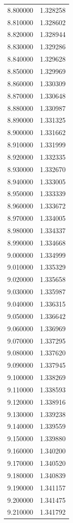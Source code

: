 \begin{tabular}{rr}
8.800000 & 1.328258 \\
8.810000 & 1.328602 \\
8.820000 & 1.328944 \\
8.830000 & 1.329286 \\
8.840000 & 1.329628 \\
8.850000 & 1.329969 \\
8.860000 & 1.330309 \\
8.870000 & 1.330648 \\
8.880000 & 1.330987 \\
8.890000 & 1.331325 \\
8.900000 & 1.331662 \\
8.910000 & 1.331999 \\
8.920000 & 1.332335 \\
8.930000 & 1.332670 \\
8.940000 & 1.333005 \\
8.950000 & 1.333339 \\
8.960000 & 1.333672 \\
8.970000 & 1.334005 \\
8.980000 & 1.334337 \\
8.990000 & 1.334668 \\
9.000000 & 1.334999 \\
9.010000 & 1.335329 \\
9.020000 & 1.335658 \\
9.030000 & 1.335987 \\
9.040000 & 1.336315 \\
9.050000 & 1.336642 \\
9.060000 & 1.336969 \\
9.070000 & 1.337295 \\
9.080000 & 1.337620 \\
9.090000 & 1.337945 \\
9.100000 & 1.338269 \\
9.110000 & 1.338593 \\
9.120000 & 1.338916 \\
9.130000 & 1.339238 \\
9.140000 & 1.339559 \\
9.150000 & 1.339880 \\
9.160000 & 1.340200 \\
9.170000 & 1.340520 \\
9.180000 & 1.340839 \\
9.190000 & 1.341157 \\
9.200000 & 1.341475 \\
9.210000 & 1.341792 \\

\end{tabular}
